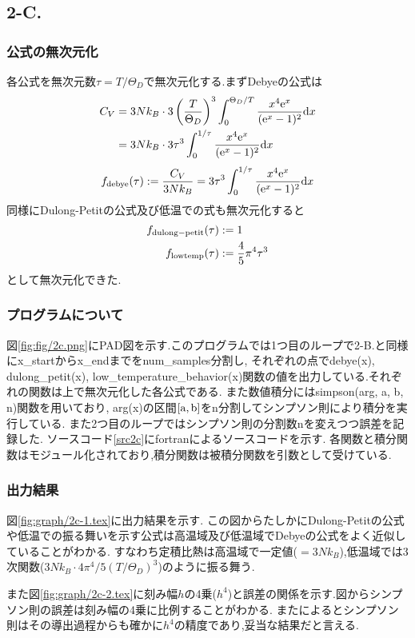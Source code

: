 \subsection*{2-C.}
\subsubsection*{公式の無次元化}
各公式を無次元数$\tau=T/\Theta_D$で無次元化する.まずDebyeの公式は
\begin{align*}
  C_V&=3Nk_B\cdot 3\left(\frac{T}{\Theta_D}\right)^3\int^{\Theta_D/T}_0\frac{x^4{\rm e}^x}{({\rm e}^x-1)^2}{\rm d}x\\
  &=3Nk_B\cdot 3\tau^3\int^{1/\tau}_0\frac{x^4{\rm e}^x}{({\rm e}^x-1)^2}{\rm d}x
\end{align*}
\begin{align*}
  f_{\rm debye}(\tau):=\frac{C_V}{3Nk_B}=3\tau^3\int^{1/\tau}_0\frac{x^4{\rm e}^x}{({\rm e}^x-1)^2}{\rm d}x
\end{align*}
同様にDulong-Petitの公式及び低温での式も無次元化すると
\begin{align*}
  f_{\rm dulong-petit}(\tau)&:=1\\
  f_{\rm lowtemp}(\tau)&:=\frac{4}{5}\pi^4\tau^3
\end{align*}
として無次元化できた.
\subsubsection*{プログラムについて}
図\ref{fig:fig/2c.png}にPAD図を示す.このプログラムでは1つ目のループで2-B.と同様にx\_startからx\_endまでをnum\_samples分割し,
それぞれの点でdebye(x), dulong\_petit(x), low\_temperature\_behavior(x)関数の値を出力している.それぞれの関数は上で無次元化した各公式である.
また数値積分にはsimpson(arg, a, b, n)関数を用いており, arg(x)の区間$\rm [a,b]$をn分割してシンプソン則により積分を実行している.
また2つ目のループではシンプソン則の分割数nを変えつつ誤差を記録した.
ソースコード\ref{src2c}にfortranによるソースコードを示す.
各関数と積分関数はモジュール化されており,積分関数は被積分関数を引数として受けている.
\subsubsection*{出力結果}
図\ref{fig:graph/2c-1.tex}に出力結果を示す.
この図からたしかにDulong-Petitの公式や低温での振る舞いを示す公式は高温域及び低温域でDebyeの公式をよく近似していることがわかる.
すなわち定積比熱は高温域で一定値($=3Nk_B$),低温域では3次関数($3Nk_B\cdot4\pi^4/5(T/\Theta_D)^3$)のように振る舞う.

また図\ref{fig:graph/2c-2.tex}に刻み幅$h$の4乗($h^4$)と誤差の関係を示す.図からシンプソン則の誤差は刻み幅の4乗に比例することがわかる.
また\cite{simpson}によるとシンプソン則はその導出過程からも確かに$h^4$の精度であり,妥当な結果だと言える.
